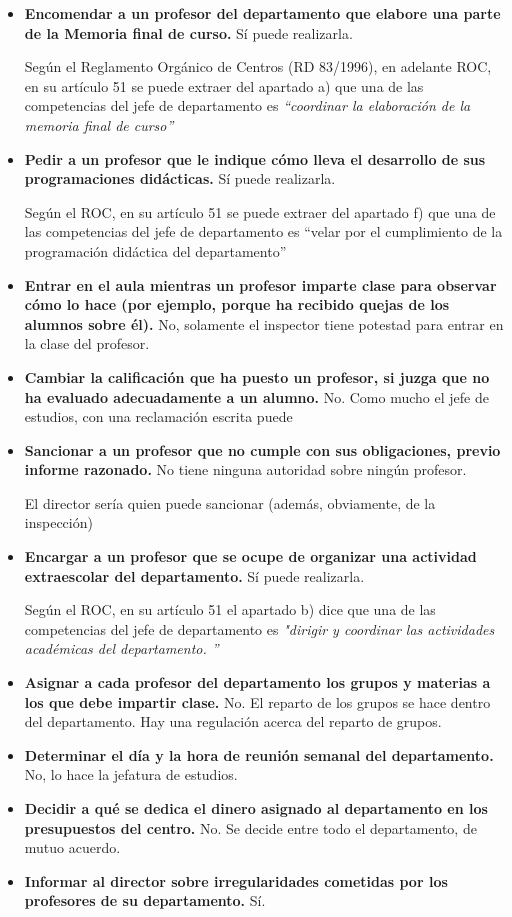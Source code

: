 \begin{itemize}

	\item \textbf{Encomendar a un profesor del departamento que elabore una parte de la Memoria final de curso.
}
	Sí puede realizarla.
 
	Según el Reglamento Orgánico de Centros (RD 83/1996), en adelante ROC, en su artículo 51 se puede extraer del apartado a) que una de las competencias del jefe de departamento es \textit{“coordinar la elaboración de la memoria final de curso”}

	\item \textbf{Pedir a un profesor que le indique cómo lleva el desarrollo de sus programaciones didácticas.
}
	Sí puede realizarla.

	Según el ROC, en su artículo 51 se puede extraer del apartado f) que una de las competencias del jefe de departamento es “velar por el cumplimiento de la programación didáctica del departamento”
	\item \textbf{Entrar en el aula mientras un profesor imparte clase para observar cómo lo hace (por ejemplo, porque ha recibido quejas de los alumnos sobre él).
}
	No, solamente el inspector tiene potestad para entrar en la clase del profesor.

	\item \textbf{Cambiar la calificación que ha puesto un profesor, si juzga que no ha evaluado adecuadamente a un alumno.
}
	No.
 Como mucho el jefe de estudios, con una reclamación escrita puede
	\item \textbf{Sancionar a un profesor que no cumple con sus obligaciones, previo informe razonado.
}
	No tiene ninguna autoridad sobre ningún profesor.
 
	El director sería quien puede sancionar (además, obviamente, de la inspección)
	\item \textbf{Encargar a un profesor que se ocupe de organizar una actividad extraescolar del departamento.
}
	Sí puede realizarla.

	Según el ROC, en su artículo 51 el apartado b) dice que una de las competencias del jefe de departamento es \textit{"dirigir y coordinar las actividades académicas del departamento.
”}
	\item \textbf{Asignar a cada profesor del departamento los grupos y materias a los que debe impartir clase.
}
	No.
 El reparto de los grupos se hace dentro del departamento.
 Hay una regulación acerca del reparto de grupos.

	\item \textbf{Determinar el día y la hora de reunión semanal del departamento.
}
	No, lo hace la jefatura de estudios.
 
	\item \textbf{Decidir a qué se dedica el dinero asignado al departamento en los presupuestos del centro.
}
	No.
 Se decide entre todo el departamento, de mutuo acuerdo.

	\item \textbf{Informar al director sobre irregularidades cometidas por los profesores de su departamento.
}
	Sí.

\end{itemize}

